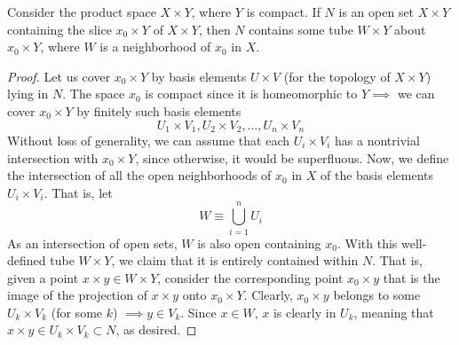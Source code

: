   \begin{lemma}
    Consider the product space $X \times Y$, where $Y$ is compact. If $N$ is an open set $X \times Y$ containing the slice $x_0 \times Y$ of $X \times Y$, then $N$ contains some tube $W \times Y$ about $x_0 \times Y$, where $W$ is a neighborhood of $x_0$ in $X$. 

    \begin{figure}[H]
      \centering 
      \label{fig:tube_lemma}
    \end{figure}
  \end{lemma}
  \begin{proof}
    Let us cover $x_0 \times Y$ by basis elements $U \times V$ (for the topology of $X \times Y$) lying in $N$. The space $x_0$ is compact since it is homeomorphic to $Y \implies$ we can cover $x_0 \times Y$ by finitely such basis elements
    \begin{equation}
      U_1 \times V_1, U_2 \times V_2, \ldots , U_n \times V_n
    \end{equation}
    Without loss of generality, we can assume that each $U_i \times V_i$ has a nontrivial intersection with $x_0 \times Y$, since otherwise, it would be superfluous. Now, we define the intersection of all the open neighborhoods of $x_0$ in $X$ of the basis elements $U_i \times V_i$. That is, let
    \begin{equation}
      W \equiv \bigcup_{i=1}^n U_i
    \end{equation}
    As an intersection of open sets, $W$ is also open containing $x_0$. With this well-defined tube $W \times Y$, we claim that it is entirely contained within $N$. That is, given a point $x \times y \in W \times Y$, consider the corresponding point $x_0 \times y$ that is the image of the projection of $x\times y$ onto $x_0 \times Y$. Clearly, $x_0 \times y$ belongs to some $U_k \times V_k$ (for some $k$) $\implies y \in V_k$. Since $x \in W$, $x$ is clearly in $U_k$, meaning that $x \times y \in U_k \times V_k \subset N$, as desired. 
  \end{proof}

